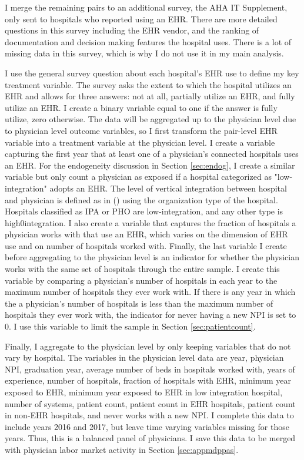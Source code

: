 \documentclass[11pt]{article}
\begin{document}
I merge the remaining pairs to an additional survey, the AHA IT Supplement, only sent to hospitals who reported using an EHR. There are more detailed questions in this survey including the EHR vendor, and the ranking of documentation and decision making features the hospital uses. There is a lot of missing data in this survey, which is why I do not use it in my main analysis. 

I use the general survey question about each hospital's EHR use to define my key treatment variable. The survey asks the extent to which the hospital utilizes an EHR and allows for three answers: not at all, partially utilize an EHR, and fully utilize an EHR. I create a binary variable equal to one if the answer is fully utilize, zero otherwise. The data will be aggregated up to the physician level due to physician level outcome variables, so I first transform the pair-level EHR variable into a treatment variable at the physician level. I create a variable capturing the first year that at least one of a physician's connected hospitals uses an EHR. For the endogeneity discussion in Section \ref{sec:endog}, I create a similar variable but only count a physician as exposed if a hospital categorized as "low-integration" adopts an EHR. The level of vertical integration between hospital and physician is defined as in \citeauthor{dynan1998assessing} (\citeyear{dynan1998assessing}) using the organization type of the hospital. Hospitals classified as IPA or PHO are low-integration, and any other type is high0integration. I also create a variable that captures the fraction of hospitals a physician works with that use an EHR, which varies on the dimension of EHR use and on number of hospitals worked with. Finally, the last variable I create before aggregating to the physician level is an indicator for whether the physician works with the same set of hospitals through the entire sample. I create this variable by comparing a physician's number of hospitals in each year to the maximum number of hospitals they ever work with. If there is any year in which the a physician's number of hospitals is less than the maximum number of hospitals they ever work with, the indicator for never having a new NPI is set to 0. I use this variable to limit the sample in Section \ref{sec:patientcount}. 

Finally, I aggregate to the physician level by only keeping variables that do not vary by hospital. The variables in the physician level data are year, physician NPI, graduation year, average number of beds in hospitals worked with, years of experience, number of hospitals, fraction of hospitals with EHR, minimum year exposed to EHR, minimum year exposed to EHR in low integration hospital, number of systems, patient count, patient count in EHR hospitals, patient count in non-EHR hospitals, and never works with a new NPI. I complete this data to include years 2016 and 2017, but leave time varying variables missing for those years. Thus, this is a balanced panel of physicians. I save this data to be merged with physician labor market activity in Section \ref{sec:appmdppas}.
\end{document}
